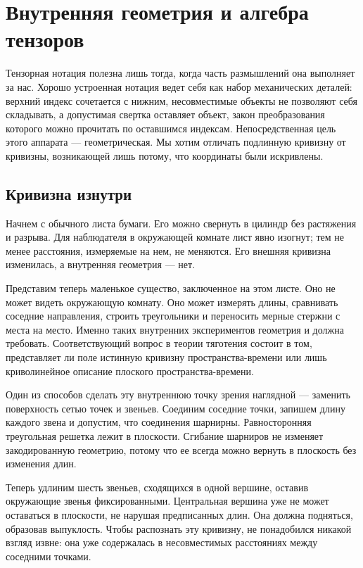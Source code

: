 \chapter{Внутренняя геометрия и алгебра тензоров}

Тензорная нотация полезна лишь тогда, когда часть размышлений она выполняет за нас. Хорошо устроенная нотация ведет себя как набор механических деталей: верхний индекс сочетается с нижним, несовместимые объекты не позволяют себя складывать, а допустимая свертка оставляет объект, закон преобразования которого можно прочитать по оставшимся индексам. Непосредственная цель этого аппарата — геометрическая. Мы хотим отличать подлинную кривизну от кривизны, возникающей лишь потому, что координаты были искривлены.

\section{Кривизна изнутри}

Начнем с обычного листа бумаги. Его можно свернуть в цилиндр без растяжения и разрыва. Для наблюдателя в окружающей комнате лист явно изогнут; тем не менее расстояния, измеряемые на нем, не меняются. Его внешняя кривизна изменилась, а внутренняя геометрия — нет.

Представим теперь маленькое существо, заключенное на этом листе. Оно не может видеть окружающую комнату. Оно может измерять длины, сравнивать соседние направления, строить треугольники и переносить мерные стержни с места на место. Именно таких внутренних экспериментов геометрия и должна требовать. Соответствующий вопрос в теории тяготения состоит в том, представляет ли поле истинную кривизну пространства-времени или лишь криволинейное описание плоского пространства-времени.

Один из способов сделать эту внутреннюю точку зрения наглядной — заменить поверхность сетью точек и звеньев. Соединим соседние точки, запишем длину каждого звена и допустим, что соединения шарнирны. Равносторонняя треугольная решетка лежит в плоскости. Сгибание шарниров не изменяет закодированную геометрию, потому что ее всегда можно вернуть в плоскость без изменения длин.

Теперь удлиним шесть звеньев, сходящихся в одной вершине, оставив окружающие звенья фиксированными. Центральная вершина уже не может оставаться в плоскости, не нарушая предписанных длин. Она должна подняться, образовав выпуклость. Чтобы распознать эту кривизну, не понадобился никакой взгляд извне: она уже содержалась в несовместимых расстояниях между соседними точками.

